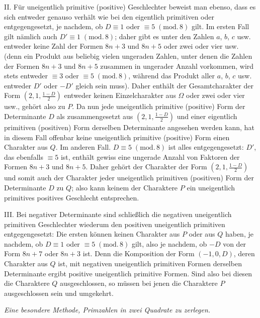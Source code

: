 II. Für uneigentlich primitive (positive) Geschlechter beweist man ebenso, dass es sich entweder genauso verhält wie bei den eigentlich primitiven oder entgegengesetzt, je nachdem, ob $D\equiv1$ oder $\equiv5\;(\mathrm{mod.}\,8)$ gilt. Im ersten Fall gilt nämlich auch $D'\equiv1\;(\mathrm{mod.}\,8)$; daher gibt es unter den Zahlen $a$, $b$, $c$ usw. entweder keine Zahl der Formen $8n+3$ und $8n+5$ oder zwei oder vier usw. (denn ein Produkt aus beliebig vielen ungeraden Zahlen, unter denen die Zahlen der Formen $8n+3$ und $8n+5$ zusammen in ungerader Anzahl vorkommen, wird stets entweder $\equiv3$ oder $\equiv5\;(\mathrm{mod.}\,8)$, während das Produkt aller $a$, $b$, $c$ usw. entweder $D'$ oder $-D'$ gleich sein muss). Daher enthält der Gesamtcharakter der Form $(2, 1, \frac{1-D}{2})$ entweder keinen Einzelcharakter aus $\Omega$ oder zwei oder vier usw., gehört also zu $P$. Da nun jede uneigentlich primitive (positive) Form der Determinante $D$ als zusammengesetzt aus $(2, 1, \frac{1-D}{2})$ und einer eigentlich primitiven (positiven) Form derselben Determinante angesehen werden kann, hat in diesem Fall offenbar keine uneigentlich primitive (positive) Form einen Charakter aus $Q$. Im anderen Fall. $D\equiv5\;(\mathrm{mod.}\,8)$ ist alles entgegengesetzt: $D'$, das ebenfalls $\equiv5$ ist, enthält gewiss eine ungerade Anzahl von Faktoren der Formen $8n+3$ und $8n+5$. Daher gehört der Charakter der Form $(2, 1, \frac{1-D}{2})$ und somit auch der Charakter jeder uneigentlich primitiven (positiven) Form der Determinante $D$ zu $Q$; also kann keinem der Charaktere $P$ ein uneigentlich primitives positives Geschlecht entsprechen.

III. Bei negativer Determinante sind schließlich die negativen uneigentlich primitiven Geschlechter wiederum den positiven uneigentlich primitiven entgegengesetzt: Die ersten können keinen Charakter aus $P$ oder aus $Q$ haben, je nachdem, ob $D\equiv1$ oder $\equiv5\;(\mathrm{mod.}\,8)$ gilt, also je nachdem, ob $-D$ von der Form $8n+7$ oder $8n+3$ ist. Denn die Komposition der Form $(-1, 0, D)$, deren Charakter aus $Q$ ist, mit negativen uneigentlich primitiven Formen derselben Determinante ergibt positive uneigentlich primitive Formen. Sind also bei diesen die Charaktere $Q$ ausgeschlossen, so müssen bei jenen die Charaktere $P$ ausgeschlossen sein und umgekehrt.

\begin{center}
\textit{Eine besondere Methode, Primzahlen in zwei Quadrate zu zerlegen.}
\end{center}

